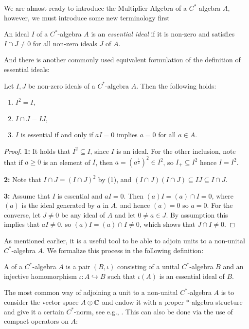 We are almost ready to introduce the Multiplier Algebra of a $C^*$-algebra $A$, however, we must introduce some new terminology first
\begin{definition}
	An ideal $I$ of a $C^*$-algebra $A$ is an  \emph{essential ideal} if it is non-zero and satisfies $I\cap J \neq 0$ for all non-zero ideals $J$ of $A$.
\end{definition}
And there is another commonly used equivalent formulation of the definition of essential ideals:
\begin{lemma}
	Let $I,J$ be non-zero ideals of a $C^*$-algebra $A$. Then the following holds:
	\begin{enumerate}
		\item $I^2 = I$,
		\item $I\cap J = IJ$,
		\item $I$ is essential if and only if $aI=0$ implies $a = 0$ for all $ a \in A$.
	\end{enumerate}	
	\label{mult:essentialequiv}
\end{lemma}
\begin{proof}
	\textbf{1:} It holds that $I^2 \subseteq I$, since $I$ is an ideal. For the other inclusion, note that if $a \geq 0 $ is an element of $I$, then $a=(a^{\frac12})^2 \in I^2$, so $I_+ \subseteq I^2$ hence $I=I^2$.

	\textbf{2:} Note that $I \cap J = (I \cap J )^2$ by (1), and $(I\cap J) (I\cap J) \subseteq IJ \subseteq I \cap J$.

	\textbf{3:} Assume that $I$ is essential and $aI = 0$. Then $(a)I=(a)\cap I = 0$, where $(a)$ is the ideal generated by $a$ in $A$, and hence $(a)=0$ so $a = 0$. For the converse, let $J \neq 0$ be any ideal of $A$ and let $0 \neq a \in J$. By assumption this implies that $aI \neq 0$, so $(a)I=(a)\cap I \neq 0$, which shows that $J \cap I \neq 0$.
\end{proof}
As mentioned earlier, it is a useful tool to be able to adjoin units to a non-unital $C^*$-algebra $A$. We formalize this process in the following definition:
\begin{definition}
	A  of a $C^*$-algebra $A$ is a pair $(B,\iota)$ consisting of a unital $C^*$-algebra $B$ and an injective homomorphism $\iota \colon A \hookrightarrow B$ such that $\iota(A)$ is an essential ideal of $B$.	
\end{definition}
The most common way of adjoining a unit to a non-unital $C^*$-algebra $A$ is to consider the vector space $A\oplus \mathbb{C}$ and endow it with a proper $*$-algebra structure and give it a certain $C^*$-norm, see e.g., \cite[Theorem 15.1]{zhu}. This can also be done via the use of compact operators on $A$:
